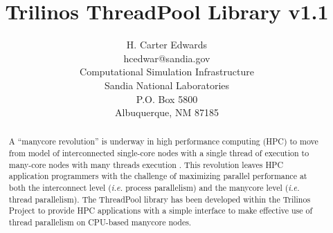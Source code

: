 \documentclass[12pt]{SANDreport}
\title{Trilinos ThreadPool Library v1.1}
\author{H. Carter Edwards \\
	hcedwar@sandia.gov \\
	Computational Simulation Infrastructure \\
	Sandia National Laboratories\\
	P.O. Box 5800\\
	Albuquerque, NM 87185 \\
}
\date{}
\begin{document}
\maketitle

%
\begin{abstract}
\vspace{-1em}
%
A ``manycore revolution'' is underway in high performance computing (HPC) to move from model of interconnected single-core nodes with a single thread of execution to many-core nodes with many threads execution 
\cite{SciDAC:ManycoreRevolution:WebSite}. 
%
This revolution leaves HPC application programmers with the challenge of maximizing parallel performance at both the interconnect level (\emph{i.e.} process parallelism) and the manycore level (\emph{i.e.} thread parallelism).
%
The ThreadPool library has been developed within the Trilinos Project \cite{Trilinos:ACM} to provide HPC applications with a simple interface to make effective use of thread parallelism on CPU-based manycore nodes.
%
\end{abstract}

%

%
\cleardoublepage		%
\tableofcontents
\listoffigures
\listofalgorithms

\end{document}
